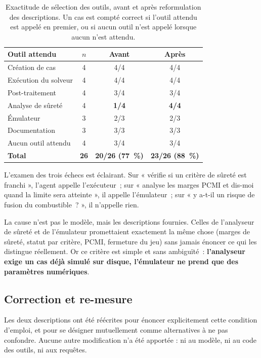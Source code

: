 \documentclass[12pt,a4paper,french]{report}
\begin{document}
\begin{table}[htbp]
\centering
\caption[Exactitude de sélection des outils]{Exactitude de sélection des outils, avant et après reformulation des
descriptions. Un cas est compté correct si l'outil attendu est appelé en
premier, ou si aucun outil n'est appelé lorsque aucun n'est attendu.}
\label{tab:toolsel}
\begin{tabularx}{\textwidth}{@{}Xccc@{}}
\toprule
\textbf{Outil attendu} & \textbf{$n$} & \textbf{Avant} & \textbf{Après}\\
\midrule
Création de cas & 4 & 4/4 & 4/4\\
Exécution du solveur & 4 & 4/4 & 4/4\\
Post-traitement & 4 & 3/4 & 3/4\\
Analyse de sûreté & 4 & \textcolor{cAlert}{\textbf{1/4}} & \textbf{4/4}\\
Émulateur & 3 & 2/3 & 2/3\\
Documentation & 3 & 3/3 & 3/3\\
Aucun outil attendu & 4 & 3/4 & 3/4\\
\midrule
\textbf{Total} & \textbf{26} & \textbf{20/26 (\SI{77}{\percent})} &
  \textbf{23/26 (\SI{88}{\percent})}\\
\bottomrule
\end{tabularx}
\end{table}

L'examen des trois échecs est éclairant. Sur « vérifie si un critère de sûreté
est franchi », l'agent appelle l'exécuteur~; sur « analyse les marges PCMI et
dis-moi quand la limite sera atteinte », il appelle l'émulateur~; sur « y a-t-il
un risque de fusion du combustible~? », il n'appelle rien.

La cause n'est pas le modèle, mais les descriptions fournies. Celles de
l'analyseur de sûreté et de l'émulateur promettaient exactement la même chose
(marges de sûreté, statut par critère, PCMI, fermeture du jeu) sans jamais
énoncer ce qui les distingue réellement. Or ce critère est simple et sans
ambiguïté~: \textbf{l'analyseur exige un cas déjà simulé sur disque, l'émulateur
ne prend que des paramètres numériques}.

\subsection{Correction et re-mesure}

Les deux descriptions ont été réécrites pour énoncer explicitement cette
condition d'emploi, et pour se désigner mutuellement comme alternatives à ne
pas confondre. Aucune autre modification n'a été apportée : ni au modèle, ni au
code des outils, ni aux requêtes.
\end{document}

